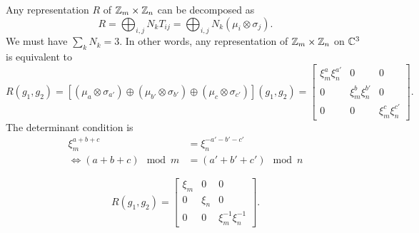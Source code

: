 \documentclass[a4paper,10pt]{article}
\begin{document}
           Any representation $R$ of $\mathbb{Z}_m\times\mathbb{Z}_n$ can be decomposed as
           \begin{equation}
               R=\bigoplus_{i,j}N_k T_{ij}=\bigoplus_{i,j}N_k(\mu_{i}\otimes\sigma_{j}).
           \end{equation}
           We must have $\sum_kN_k=3$. In other words, any representation of $\mathbb{Z}_m\times\mathbb{Z}_n$ on $\mathbb{C}^3$ is equivalent to
           \begin{equation}
                R(g_1,g_2)=[(\mu_{a}\otimes\sigma_{a'})\oplus(\mu_{b'}\otimes\sigma_{b'})\oplus(\mu_{c}\otimes\sigma_{c'})](g_1,g_2)=
               \begin{bmatrix}
                   \xi^a_m\xi^{a'}_n & 0 & 0 \\
                   0 & \xi^b_m\xi^{b'}_n & 0 \\
                   0 & 0 & \xi^c_m\xi^{c'}_n
               \end{bmatrix}.
           \end{equation}
           The determinant condition is
           \begin{align}
                \xi^{a+b+c}_m &= \xi^{-a'-b'-c'}_n\\
               \Leftrightarrow (a+b+c)\mod m &= (a'+b'+c')\mod n
           \end{align}

           

           \begin{equation}
            R(g_1,g_2)=
           \begin{bmatrix}
               \xi_m & 0 & 0 \\
               0 & \xi_n & 0 \\
               0 & 0 & \xi^{-1}_m\xi^{-1}_n
           \end{bmatrix}.
       \end{equation}
\end{document}
